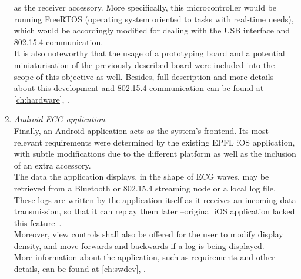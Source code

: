 \begin{enumerate}
				as the receiver accessory. More specifically, this microcontroller would be running FreeRTOS
				(operating system oriented to tasks with real-time needs), which would be accordingly modified
				for dealing with the USB interface and 802.15.4 communication.\\
				It is also noteworthy that the usage of a prototyping board and a potential miniaturisation of
				the previously described board were included into the scope of this objective as well. Besides, 
				full description and more details about this development and 802.15.4 communication can be found 
				at \autoref{ch:hardware}, .\\
			\item \emph{Android ECG application}\\
				Finally, an Android application acts as the system's frontend. Its most relevant requirements were
				determined by the existing EPFL iOS application, with subtle modifications due to the different
				platform as well as the inclusion of an extra accessory.\\
				The data the application displays, in the shape of ECG waves, may be retrieved from a Bluetooth
				or 802.15.4 streaming node or a local log file. These logs are written by the application itself
				as it receives an incoming data transmission, so that it can replay them later --original
				iOS application lacked this feature--.\\
				Moreover, view controls shall also be offered for the user to modify display density, and move
				forwards and backwards if a log is being displayed.\\
				More information about the application, such as requirements and other details, can be found
				at \autoref{ch:swdev}, .\\
		\end{enumerate}
		
